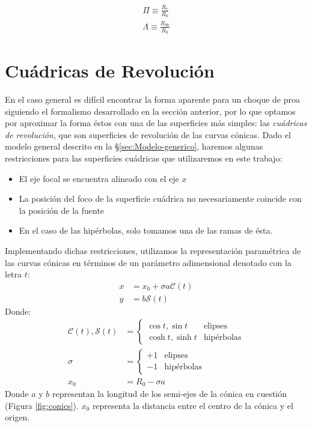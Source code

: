 \begin{align}
  \Pi \equiv \frac{R_c}{R_0} \label{eq:planitude}\\
  \Lambda \equiv \frac{R_{90}}{R_0} \label{eq:alatude}
\end{align}

\section{Cuádricas de Revolución}
\label{sec:quadrics}
\newcommand\Sin{\ensuremath{\mathcal{S}}}
\newcommand\Cos{\ensuremath{\mathcal{C}}}
\newcommand\Cot{\ensuremath{\mathcal{T}}}
\newcommand\Q{\ensuremath{\mathcal{Q}}}
\newcommand\fQi{\ensuremath{f_{\scriptscriptstyle \Q, i}}}
En el caso general es difícil encontrar la forma aparente para un choque de proa siguiendo el formalismo desarrollado en la sección anterior, por lo que optamos por aproximar la forma éstos con una de las superficies más simples: las \textit{cuádricas de revolución}, que son superficies de revolución de las curvas cónicas. Dado el modelo general descrito en la \S \ref{sec:Modelo-generico}, haremos algunas restricciones para las superficies cuádricas que utilizaremos en este trabajo:
\begin{itemize}
  \item El eje focal se encuentra alineado con el eje $x$
  \item La posición del foco de la superficie cuádrica no necesariamente coincide con la posición de la fuente
  \item En el caso de las hipérbolas, solo tomamos una de las ramas de ésta.
\end{itemize}
Implementando dichas restricciones, utilizamos la representación paramétrica de las curvas cónicas en términos de un parámetro adimensional denotado con la letra $t$:
\begin{align}
  x &= x_0 + \sigma a\Cos(t) \\
  y &= b\Sin(t) 
\end{align}
Donde:
\begin{align}
  \Cos(t), \Sin(t) &=\left\lbrace
  \begin{array}{lr}
    \cos{t}, \sin t & \mathrm{elipses}\\
    \cosh{t}, \sinh{t} & \mathrm{hipérbolas}       
  \end{array}\right. \\
  \sigma &= \left\lbrace
  \begin{array}{lr}
    +1 & \mathrm{elipses} \\
    -1 & \mathrm{hipérbolas}
  \end{array}\right. \\
  x_0 &= R_0 -\sigma a \label{eq:x0} 
\end{align}
Donde $a$ y $b$ representan la longitud de los semi-ejes de la cónica en cuestión (Figura \ref{fig:conics}). $x_0$ representa la distancia entre el centro de la cónica y el origen. 

